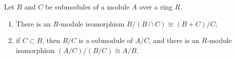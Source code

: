 Let $B$ and $C$ be submodules of a module $A$ over a ring $R$.
\begin{enumerate}
\item[(i)] There is an $R$-module isomorphism $B/(B \cap C) \cong (B + C)/C$;
\item[(ii)] if $C \subset B$, then $B/C$ is a submodule of $A/C$, and there is an $R$-module isomorphism $(A/C)/(B/C) \cong A/B$.
\end{enumerate}
